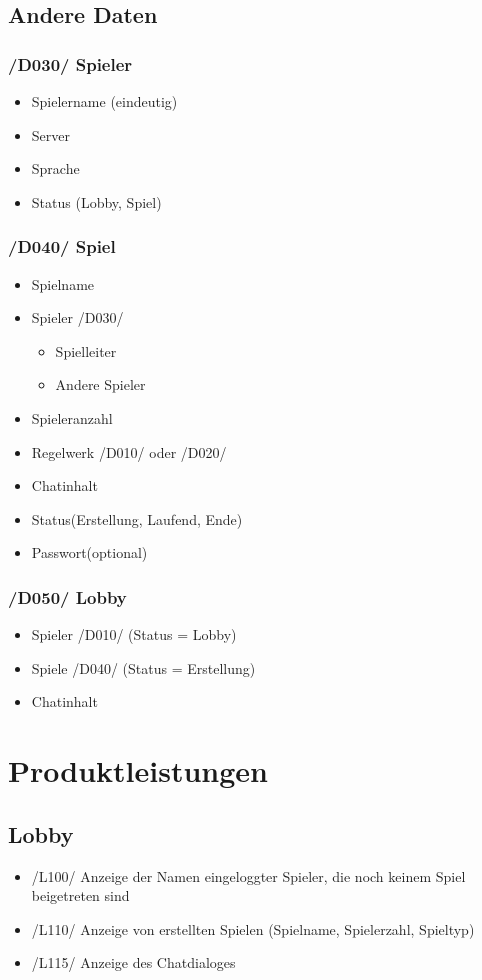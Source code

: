 \documentclass{article}
\begin{document}
\subsection{Andere Daten}
\subsubsection{/D030/ Spieler}
\begin{itemize}
	\item Spielername (eindeutig)
	\item \gls{Server}
	\item Sprache
	\item Status (\gls{Lobby}, Spiel)
\end{itemize}	

\subsubsection{/D040/ Spiel}
\begin{itemize}
	\item Spielname
	\item Spieler /D030/
	\begin{itemize}
		\item \gls{Spielleiter}
		\item Andere Spieler
	\end{itemize}
	\item Spieleranzahl
	\item Regelwerk /D010/ oder /D020/
	\item Chatinhalt
	\item Status(Erstellung, Laufend, Ende)
	\item Passwort(optional)
\end{itemize}

\subsubsection{/D050/ \gls{Lobby}}
\begin{itemize}
	\item Spieler /D010/ (Status = \gls{Lobby})
	\item Spiele /D040/ (Status = Erstellung)
	\item Chatinhalt
\end{itemize}

\section{Produktleistungen}
\subsection{\gls{Lobby}}
\begin{itemize}
	\item /L100/ Anzeige der Namen eingeloggter Spieler, die noch keinem Spiel beigetreten sind
	\item /L110/ Anzeige von erstellten Spielen (Spielname, Spielerzahl, Spieltyp)	
	\item /L115/ Anzeige des Chatdialoges		
\end{itemize}
\end{document}
